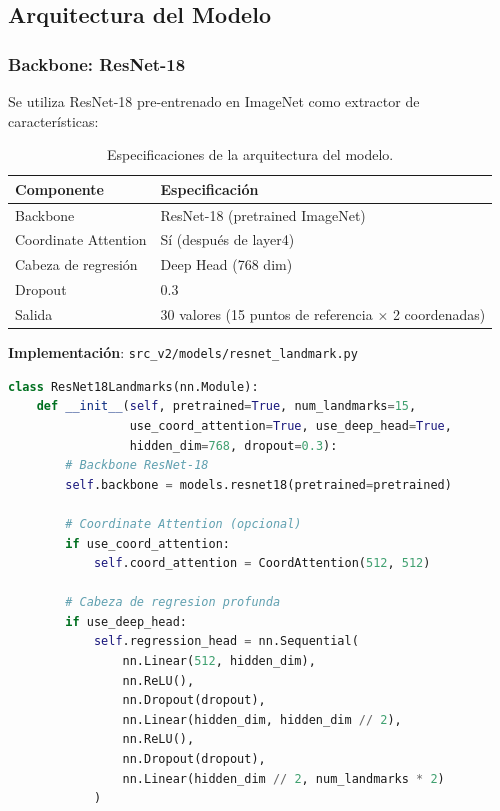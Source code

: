 \documentclass[12pt,a4paper]{article}
\newcommand{\code}[1]{\texttt{#1}}
\begin{document}
\subsection{Arquitectura del Modelo}

\subsubsection{Backbone: ResNet-18}

Se utiliza ResNet-18 pre-entrenado en ImageNet como extractor de características:

\begin{table}[H]
\centering
\begin{tabular}{ll}
\toprule
\textbf{Componente} & \textbf{Especificación} \\
\midrule
Backbone & ResNet-18 (pretrained ImageNet) \\
Coordinate Attention & Sí (después de layer4) \\
Cabeza de regresión & Deep Head (768 dim) \\
Dropout & 0.3 \\
Salida & 30 valores (15 puntos de referencia $\times$ 2 coordenadas) \\
\bottomrule
\end{tabular}
\caption{Especificaciones de la arquitectura del modelo.}
\end{table}

\textbf{Implementación}: \code{src\_v2/models/resnet\_landmark.py}

\begin{lstlisting}[language=Python]
class ResNet18Landmarks(nn.Module):
    def __init__(self, pretrained=True, num_landmarks=15,
                 use_coord_attention=True, use_deep_head=True,
                 hidden_dim=768, dropout=0.3):
        # Backbone ResNet-18
        self.backbone = models.resnet18(pretrained=pretrained)

        # Coordinate Attention (opcional)
        if use_coord_attention:
            self.coord_attention = CoordAttention(512, 512)

        # Cabeza de regresion profunda
        if use_deep_head:
            self.regression_head = nn.Sequential(
                nn.Linear(512, hidden_dim),
                nn.ReLU(),
                nn.Dropout(dropout),
                nn.Linear(hidden_dim, hidden_dim // 2),
                nn.ReLU(),
                nn.Dropout(dropout),
                nn.Linear(hidden_dim // 2, num_landmarks * 2)
            )
\end{lstlisting}
\end{document}
